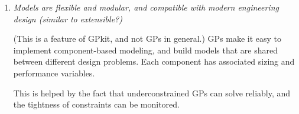 \begin{enumerate}
    \item \textit{Models are flexible and modular, and compatible with modern
    engineering design (similar to extensible?)}

(This is a feature of GPkit, and not GPs in general.) \gls{GP}s make it easy to
implement component-based modeling, and build models that are shared between
different design problems. Each component has associated sizing and performance
variables.

This is helped by the fact that underconstrained \gls{GP}s can solve reliably,
and the tightness of constraints can be monitored.

\end{enumerate}



